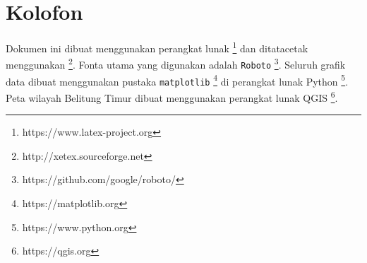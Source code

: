 \newpage{}\thispagestyle{empty}

\markboth{}{}
\section*{Kolofon}
Dokumen ini dibuat menggunakan perangkat lunak \LaTeXe \footnote{https://www.latex-project.org} dan ditatacetak menggunakan \XeLaTeX \footnote{http://xetex.sourceforge.net}.
Fonta utama yang digunakan adalah \texttt{Roboto} \footnote{https://github.com/google/roboto/}. Seluruh grafik data dibuat menggunakan pustaka \texttt{matplotlib} \footnote{https://matplotlib.org} di perangkat lunak Python \footnote{https://www.python.org}. Peta wilayah Belitung Timur dibuat menggunakan perangkat lunak QGIS \footnote{https://qgis.org}.
\clearpage{}